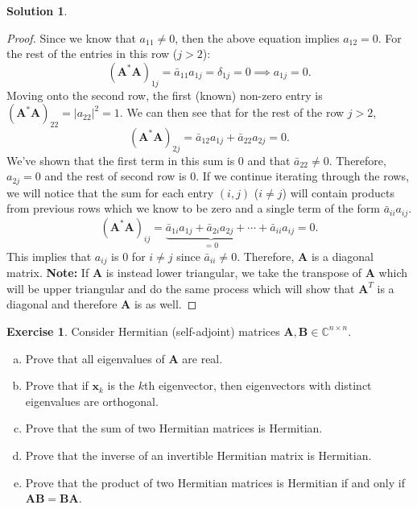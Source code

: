 \documentclass[12pt]{article}
\newcommand{\bbC}{\mathbb{C}}
\newcommand{\abs}[1]{ \left| #1 \right| }
\renewcommand{\vec}[1]{\mathbf{#1}}
\theoremstyle{definition}
\newtheorem{exer}{Exercise}
\newtheorem{sol}{Solution}
\theoremstyle{remark}
\begin{document}
\begin{sol}
\begin{proof}
Since we know that $a_{11} \neq 0$, then the above equation implies $a_{12} = 0$. For the rest of the entries in this row ($j>2$):
\begin{equation}
    (\vec{A}^*\vec{A})_{1j} = \bar{a}_{11}a_{1j} = \delta_{1j} = 0 \implies a_{1j} =0.
\end{equation}
Moving onto the second row, the first (known) non-zero entry is $(\vec{A}^*\vec{A})_{22} = \abs{a_{22}}^2 = 1$. We can then see that for the rest of the row $j > 2$,
\begin{equation}
    (\vec{A}^*\vec{A})_{2j} = \bar{a}_{12}a_{1j} + \bar{a}_{22}a_{2j} = 0.
\end{equation}
We've shown that the first term in this sum is 0 and that $\bar{a}_{22} \neq 0$. Therefore, $a_{2j}=0$ and the rest of second row is 0. If we continue iterating through the rows, we will notice that the sum for each entry $(i,j)$ ($i\neq j$) will contain products from previous rows which we know to be zero and a single term of the form $\bar{a}_{ii}a_{ij}$. 
\begin{equation}
    (\vec{A}^*\vec{A})_{ij} = \underbrace{\bar{a}_{1i}a_{1j} + \bar{a}_{2i}a_{2j} + \cdots}_{=0} + \bar{a}_{ii}a_{ij} = 0.
\end{equation}
This implies that $a_{ij}$ is 0 for $i\neq j$ since $\bar{a}_{ii}\neq 0$. Therefore, $\vec{A}$ is a diagonal matrix.
\textbf{Note:} If $\vec{A}$ is instead lower triangular, we take the transpose of $\vec{A}$ which will be upper triangular and do the same process which will show that $\vec{A}^T$ is a diagonal and therefore $\vec{A}$ is as well.
\end{proof}

\end{sol}

\newpage

\begin{exer}
    Consider Hermitian (self-adjoint) matrices $\vec{A}, \vec{B} \in \bbC^{n\times n}$.
    \begin{enumerate}[a.]
        \item Prove that all eigenvalues of $\vec{A}$ are real.
        \item Prove that if $\vec{x}_k$ is the $k$th eigenvector, then eigenvectors with distinct eigenvalues are orthogonal.
        \item Prove that the sum of two Hermitian matrices is Hermitian.
        \item Prove that the inverse of an invertible Hermitian matrix is Hermitian.
        \item Prove that the product of two Hermitian matrices is Hermitian if and only if $\vec{AB} = \vec{BA}$.
    \end{enumerate}
\end{exer}
\end{document}
